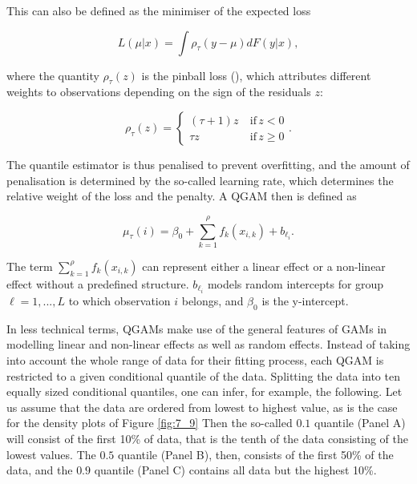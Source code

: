 This can also be defined as the minimiser of the expected loss

\begin{equation}
\label{eq:Lmux}
    L(\mu|x)=\int \rho_{\tau}(y-\mu)dF(y|x),
\end{equation}

\noindent where the quantity $\rho_{\tau}(z)$ is the pinball loss (\cite{Koenker2005, Gneiting2011}), which attributes different weights to observations depending on the sign of the residuals $z$:

\begin{equation}
\label{eq:rhotauz}
    \rho_{\tau}(z)=\left \{ \begin{matrix}
    (\tau+1)z\ & \mathrm{if}\, z<0\\ 
    \tau z & \mathrm{if} \, z\geq 0
    \end{matrix} \right..
\end{equation}

The quantile estimator is thus penalised to prevent overfitting, and the amount of penalisation is determined by the so-called learning rate, which determines the relative weight of the loss and the penalty. A QGAM then is defined as

\begin{equation}
\label{eq:mutaui}
    \mu_{\tau}(i)=\beta_{0}+\sum_{k=1}^{\rho}f_{k}(x_{i,k})+b_{\ell_{i}}.
\end{equation}

The term $\sum_{k=1}^{\rho}f_{k}(x_{i,k})$ can represent either a linear effect or a non-linear effect without a predefined structure. $b_{\ell_{i}}$ models random intercepts for group $\ell=1,...,L$ to which observation $i$ belongs, and $\beta_{0}$ is the y-intercept.

In less technical terms, QGAMs make use of the general features of GAMs in modelling linear and non-linear effects as well as random effects. Instead of taking into account the whole range of data for their fitting process, each QGAM is restricted to a given conditional quantile of the data. Splitting the data into ten equally sized conditional quantiles, one can infer, for example, the following. Let us assume that the data are ordered from lowest to highest value, as is the case for the density plots of Figure \ref{fig:7_9} Then the so-called $0.1$ quantile (Panel A) will consist of the first 10\% of data, that is the tenth of the data consisting of the lowest values. The $0.5$ quantile (Panel B), then, consists of the first 50\% of the data, and the $0.9$ quantile (Panel C) contains all data but the highest 10\%. 

